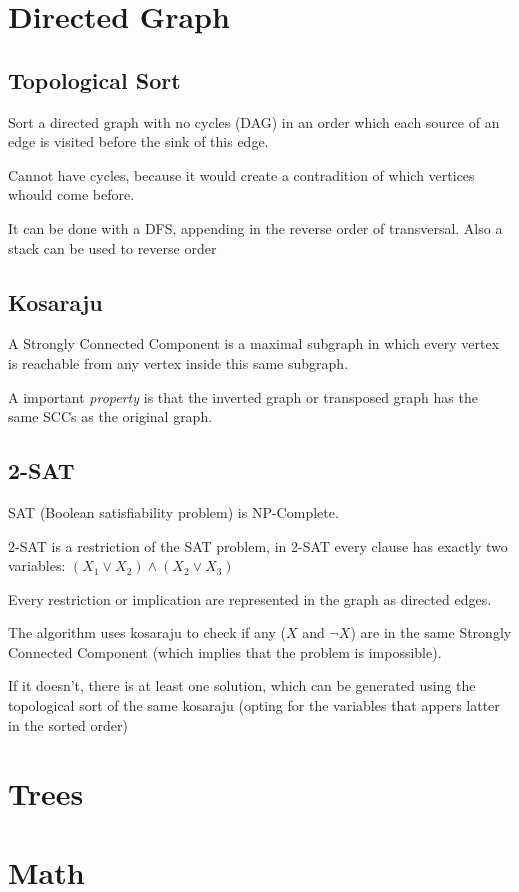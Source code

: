 	
	\section{Directed Graph}

	\subsection{Topological Sort}

	Sort a directed graph with no cycles (DAG) in an order which each source of an edge is visited before the sink of this edge.

	Cannot have cycles, because it would create a contradition of which vertices whould come before.

	It can be done with a DFS, appending in the reverse order of transversal. Also a stack can be used to reverse order	


	\subsection{Kosaraju}

	A Strongly Connected Component is a maximal subgraph in which every vertex is reachable
	from any vertex inside this same subgraph.

	A important \textit{property} is that the inverted graph or transposed graph has the same SCCs
	as the original graph.


	\subsection{2-SAT}
	
		SAT (Boolean satisfiability problem) is NP-Complete.

		2-SAT is a restriction of the SAT problem, in 2-SAT every clause has exactly two variables:
		$ (X_1 \vee X_2) \wedge (X_2 \vee X_3) $

		Every restriction or implication are represented in the graph as directed edges.

		The algorithm uses kosaraju to check if any ($X$ and $\neg{X}$) are in the same Strongly Connected Component 
		(which implies that the problem is impossible). 

		If it doesn't, there is at least one solution, which can be generated using the topological sort of the same kosaraju 
		(opting for the variables that appers latter in the sorted order)


\section{Trees}

\section{Math}
